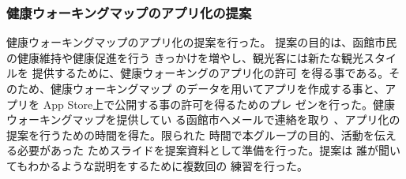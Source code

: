 ﻿\subsubsection{健康ウォーキングマップのアプリ化の提案}
健康ウォーキングマップのアプリ化の提案を行った。
提案の目的は、函館市民の健康維持や健康促進を行う
きっかけを増やし、観光客には新たな観光スタイルを
提供するために、健康ウォーキングのアプリ化の許可
を得る事である。そのため、健康ウォーキングマップ
のデータを用いてアプリを作成する事と、アプリを
App Store上で公開する事の許可を得るためのプレ
ゼンを行った。健康ウォーキングマップを提供してい
る函館市へメールで連絡を取り
、アプリ化の提案を行うための時間を得た。限られた
時間で本グループの目的、活動を伝える必要があった
ためスライドを提案資料として準備を行った。提案は
誰が聞いてもわかるような説明をするために複数回の
練習を行った。
